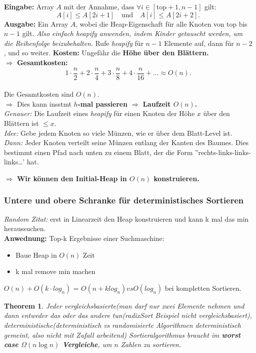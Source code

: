 \documentclass{article}
\newtheorem{thm}{Theorem}[section]
\begin{document}
{\textbf{Eingabe:} Array \(A\) mit der Annahme, dass \(\forall i \in [\text{top} + 1, n - 1]\) gilt: \\
\[
A[i] \leq A[2i + 1] \quad \text{und} \quad A[i] \leq A[2i + 2].
\]
\textbf{Ausgabe:} Ein Array \(A\), wobei die Heap-Eigenschaft für alle Knoten von \(\text{top}\) bis \(n - 1\) gilt.
\textit{Also einfach heapify anwenden, indem Kinder getauscht werden, um die Reihenfolge beizubehalten.} \newline
Rufe \textit{heapify} für \(n - 1\) Elemente auf, dann für \(n - 2\), und so weiter. \newline
\textbf{Kosten:} Ungefähr die \textbf{Höhe über den Blättern.}\newline \\
\(\Rightarrow\) \textbf{Gesamtkosten: }
\[
1 \cdot \frac{n}{2} + 2 \cdot \frac{n}{4} + 3 \cdot \frac{n}{8} + 4 \cdot \frac{n}{16} + \dots \approx O(n).
\]\\
\(\text{Die Gesamtkosten sind } O(n).\) \\
\(\Rightarrow\) Dies kann insstmt \textbf{\(h\)-mal passieren} \(\Rightarrow\)\textbf{ Laufzeit \(O(n)\).} \\
\textit{Genauer:} Die Laufzeit eines \textit{heapify} für einen Knoten der Höhe \(x\) über den Blättern ist \(\leq x\). \\ \newline
\textit{Idee:} Gebe jedem Knoten so viele Münzen, wie er über dem Blatt-Level ist. \\
\textit{Dann:} Jeder Knoten verteilt seine Münzen entlang der Kanten des Baumes. Dies bestimmt einen Pfad nach unten zu einem Blatt, der die Form ''rechts-links-links-links\dots' hat.

\(\Rightarrow\) \textbf{Wir können den Initial-Heap in \(O(n)\) konstruieren.}}
\subsubsection{Untere und obere Schranke für deterministisches Sortieren}

\textit{Random Zitat: } erst in Linearzeit den Heap konstruieren und kann k mal das min heraussuchen. \\
\textbf{Anwednung: } Top-k Ergebnisse einer Suchmaschine:
\begin{itemize}
    \item Baue Heap in  $O(n)$ Zeit
    \item k mal remove min machen
\end{itemize}
\rightarrow $O(n) + O(k \cdot log_n) $ = $O(n + k log_n) vs O(log_n)$ bei kompletten Sortieren.\\
\begin{thm}
Jeder vergleichsbasierte(man darf nur zwei Elemente nehmen und dann entweder das oder das andere tun(radixSort Beispiel nicht vergleichsbasiert), deterministische(deterministisch vs randomisierte Algorithmen deterministisch gemeint, also nicht mit Zufall arbeitend) Sortieralgorithmus braucht im\textbf{ worst case $\Omega(n\log n)$ Vergleiche}, um
$n$ Zahlen zu sortieren. 
\end{thm}
\end{document}
